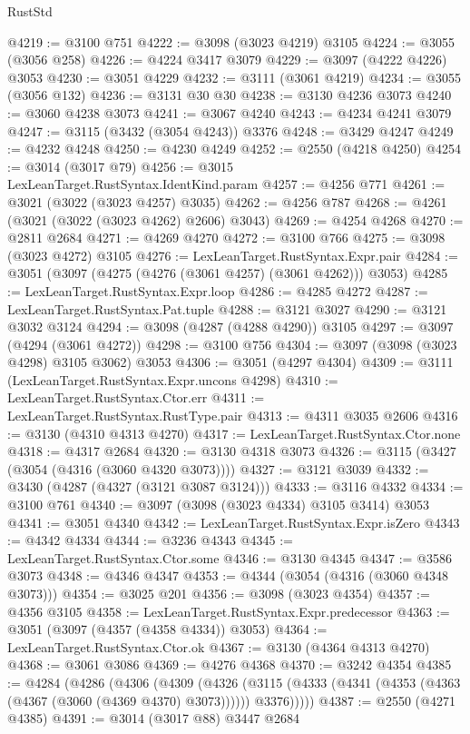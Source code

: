\begin{lexlean}{RustStd}
\begin{coremodule}
@4219 := @3100 @751
@4222 := @3098 (@3023 @4219) @3105
@4224 := @3055 (@3056 @258)
@4226 := @4224 @3417 @3079
@4229 := @3097 (@4222 @4226) @3053
@4230 := @3051 @4229
@4232 := @3111 (@3061 @4219)
@4234 := @3055 (@3056 @132)
@4236 := @3131 @30 @30
@4238 := @3130 @4236 @3073
@4240 := @3060 @4238 @3073
@4241 := @3067 @4240
@4243 := @4234 @4241 @3079
@4247 := @3115 (@3432 (@3054 @4243)) @3376
@4248 := @3429 @4247
@4249 := @4232 @4248
@4250 := @4230 @4249
@4252 := @2550 (@4218 @4250)
@4254 := @3014 (@3017 @79)
@4256 := @3015 LexLeanTarget.RustSyntax.IdentKind.param
@4257 := @4256 @771
@4261 := @3021 (@3022 (@3023 @4257) @3035)
@4262 := @4256 @787
@4268 := @4261 (@3021 (@3022 (@3023 @4262) @2606) @3043)
@4269 := @4254 @4268
@4270 := @2811 @2684
@4271 := @4269 @4270
@4272 := @3100 @766
@4275 := @3098 (@3023 @4272) @3105
@4276 := LexLeanTarget.RustSyntax.Expr.pair
@4284 := @3051 (@3097 (@4275 (@4276 (@3061 @4257) (@3061 @4262))) @3053)
@4285 := LexLeanTarget.RustSyntax.Expr.loop
@4286 := @4285 @4272
@4287 := LexLeanTarget.RustSyntax.Pat.tuple
@4288 := @3121 @3027
@4290 := @3121 @3032 @3124
@4294 := @3098 (@4287 (@4288 @4290)) @3105
@4297 := @3097 (@4294 (@3061 @4272))
@4298 := @3100 @756
@4304 := @3097 (@3098 (@3023 @4298) @3105 @3062) @3053
@4306 := @3051 (@4297 @4304)
@4309 := @3111 (LexLeanTarget.RustSyntax.Expr.uncons @4298)
@4310 := LexLeanTarget.RustSyntax.Ctor.err
@4311 := LexLeanTarget.RustSyntax.RustType.pair
@4313 := @4311 @3035 @2606
@4316 := @3130 (@4310 @4313 @4270)
@4317 := LexLeanTarget.RustSyntax.Ctor.none
@4318 := @4317 @2684
@4320 := @3130 @4318 @3073
@4326 := @3115 (@3427 (@3054 (@4316 (@3060 @4320 @3073))))
@4327 := @3121 @3039
@4332 := @3430 (@4287 (@4327 (@3121 @3087 @3124)))
@4333 := @3116 @4332
@4334 := @3100 @761
@4340 := @3097 (@3098 (@3023 @4334) @3105 @3414) @3053
@4341 := @3051 @4340
@4342 := LexLeanTarget.RustSyntax.Expr.isZero
@4343 := @4342 @4334
@4344 := @3236 @4343
@4345 := LexLeanTarget.RustSyntax.Ctor.some
@4346 := @3130 @4345
@4347 := @3586 @3073
@4348 := @4346 @4347
@4353 := @4344 (@3054 (@4316 (@3060 @4348 @3073)))
@4354 := @3025 @201
@4356 := @3098 (@3023 @4354)
@4357 := @4356 @3105
@4358 := LexLeanTarget.RustSyntax.Expr.predecessor
@4363 := @3051 (@3097 (@4357 (@4358 @4334)) @3053)
@4364 := LexLeanTarget.RustSyntax.Ctor.ok
@4367 := @3130 (@4364 @4313 @4270)
@4368 := @3061 @3086
@4369 := @4276 @4368
@4370 := @3242 @4354
@4385 := @4284
    (@4286
      (@4306
        (@4309
          (@4326
            (@3115 (@4333 (@4341 (@4353 (@4363 (@4367 (@3060 (@4369 @4370) @3073)))))) @3376)))))
@4387 := @2550 (@4271 @4385)
@4391 := @3014 (@3017 @88) @3447 @2684

\end{coremodule}
\end{lexlean}
